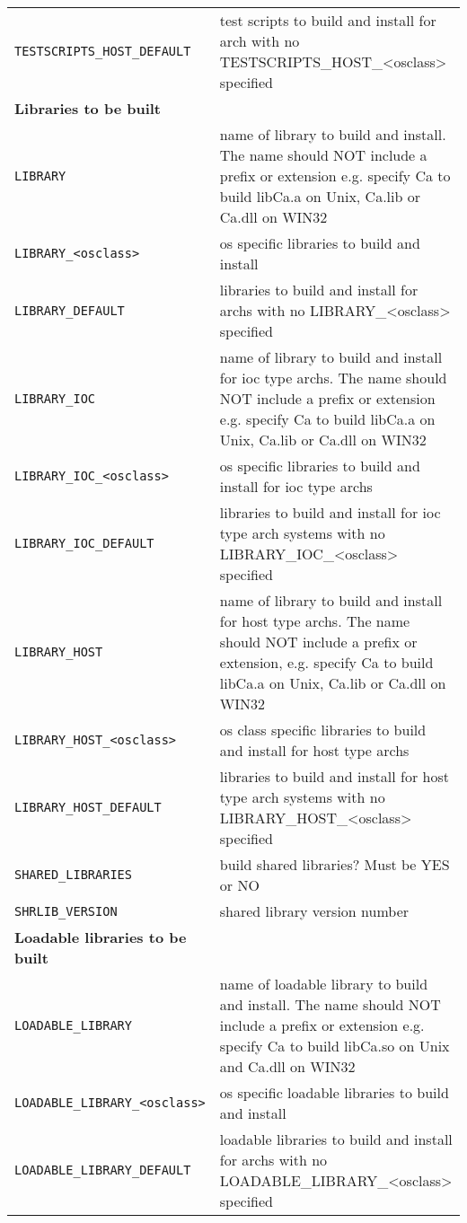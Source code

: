 \begin{center}
\begin{longtable}{p{2.94784in}p{3.76247in}}
\verb|TESTSCRIPTS_HOST_DEFAULT| & test scripts to build and install for arch with no TESTSCRIPTS\_HOST\_\textless{}osclass\textgreater{} specified\\
\textbf{Libraries to be built} & \\
\hline
\verb|LIBRARY| & name of library to build and install. The name should NOT include a prefix or extension e.g. specify Ca to build libCa.a on Unix, Ca.lib or Ca.dll on WIN32\\
\verb|LIBRARY_<osclass>| & os specific libraries to build and install\\
\verb|LIBRARY_DEFAULT| & libraries to build and install for archs with no LIBRARY\_\textless{}osclass\textgreater{} specified\\
\verb|LIBRARY_IOC| & name of library to build and install for ioc type archs. The name should NOT include a prefix or extension e.g. specify Ca to build libCa.a on Unix, Ca.lib or Ca.dll on WIN32\\
\verb|LIBRARY_IOC_<osclass>| & os specific libraries to build and install for ioc type archs\\
\verb|LIBRARY_IOC_DEFAULT| & libraries to build and install for ioc type arch systems with no LIBRARY\_IOC\_\textless{}osclass\textgreater{} specified\\
\verb|LIBRARY_HOST| & name of library to build and install for host type archs. The name should NOT include a prefix or extension, e.g. specify Ca to build libCa.a on Unix, Ca.lib or Ca.dll on WIN32\\
\verb|LIBRARY_HOST_<osclass>| & os class specific libraries to build and install for host type archs\\
\verb|LIBRARY_HOST_DEFAULT| & libraries to build and install for host type arch systems with no LIBRARY\_HOST\_\textless{}osclass\textgreater{} specified\\
\verb|SHARED_LIBRARIES| & build shared libraries? Must be YES or NO\\
\verb|SHRLIB_VERSION| & shared library version number\\
\textbf{Loadable libraries to be built} & \\
\hline
\verb|LOADABLE_LIBRARY| & name of loadable library to build and install. The name should NOT include a prefix or extension e.g. specify Ca to build libCa.so on Unix and Ca.dll on WIN32\\
\verb|LOADABLE_LIBRARY_<osclass>| & os specific loadable libraries to build and install\\
\verb|LOADABLE_LIBRARY_DEFAULT| & loadable libraries to build and install for archs with no LOADABLE\_LIBRARY\_\textless{}osclass\textgreater{} specified\\

\end{longtable}
\end{center}
